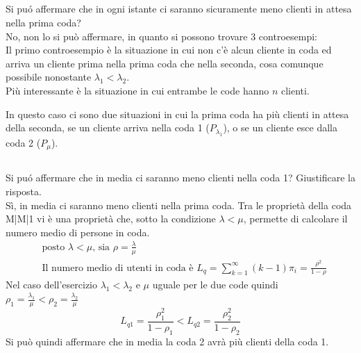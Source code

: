 \documentclass[a4paper]{article}
\begin{document}
\subsection{}
Si puó affermare che in ogni istante ci saranno sicuramente meno clienti in attesa nella prima coda?\\
No, non lo si può affermare, in quanto si possono trovare 3 controesempi:\\
Il primo controesempio è la situazione in cui non c'è alcun cliente in coda ed arriva un cliente prima nella prima coda che nella seconda, cosa comunque possibile nonostante $\lambda_1 < \lambda_2$.\\
Più interessante è la situazione in cui entrambe le code hanno $n$ clienti. 
\begin{center}\end{center}
In questo caso ci sono due situazioni in cui la prima coda ha più clienti in attesa della seconda, se un cliente arriva nella coda 1 ($P_{\lambda_1}$), o se un cliente esce dalla coda 2 ($P_\mu$).
\subsection{}
Si puó affermare che in media ci saranno meno clienti nella coda 1? Giustificare la risposta.\\
Sì, in media ci saranno meno clienti nella prima coda. Tra le proprietà della coda M|M|1 vi è una proprietà che, sotto la condizione $\lambda < \mu$, permette di calcolare il numero medio di persone in coda.
\begin{align*}
	&\text{posto } \lambda < \mu \text{, sia } \rho = \frac{\lambda}{\mu} \\
	&\text{Il numero medio di utenti in coda è } L_{q}=\sum_{k=1}^{\infty}{(k-1)\pi_{i}}=\frac{\rho^{2}}{1-\rho}
\end{align*}
Nel caso dell'esercizio $\lambda_1 < \lambda_2$ e $\mu$ uguale per le due code quindi\\ $\rho_1 = \frac{\lambda_1}{\mu} < \rho_2 = \frac{\lambda_2}{\mu}$
$$L_{q1} = \frac{\rho_1^{2}}{1-\rho_1} < L_{q2} = \frac{\rho_2^{2}}{1-\rho_2}$$
Si può quindi affermare che in media la coda 2 avrà più clienti della coda 1.
\end{document}
